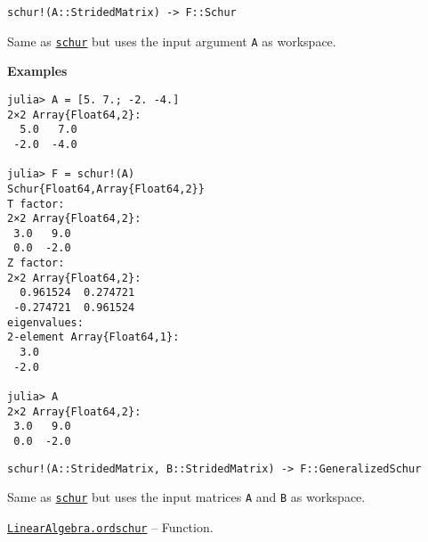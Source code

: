 \begin{adjustwidth}{2em}{0pt}


\begin{verbatim}
schur!(A::StridedMatrix) -> F::Schur
\end{verbatim}

Same as \hyperlink{17132870828407138368}{\texttt{schur}} but uses the input argument \texttt{A} as workspace.

\textbf{Examples}


\begin{verbatim}
julia> A = [5. 7.; -2. -4.]
2×2 Array{Float64,2}:
  5.0   7.0
 -2.0  -4.0

julia> F = schur!(A)
Schur{Float64,Array{Float64,2}}
T factor:
2×2 Array{Float64,2}:
 3.0   9.0
 0.0  -2.0
Z factor:
2×2 Array{Float64,2}:
  0.961524  0.274721
 -0.274721  0.961524
eigenvalues:
2-element Array{Float64,1}:
  3.0
 -2.0

julia> A
2×2 Array{Float64,2}:
 3.0   9.0
 0.0  -2.0
\end{verbatim}




\begin{lstlisting}
schur!(A::StridedMatrix, B::StridedMatrix) -> F::GeneralizedSchur
\end{lstlisting}

Same as \hyperlink{17132870828407138368}{\texttt{schur}} but uses the input matrices \texttt{A} and \texttt{B} as workspace.



\end{adjustwidth}
\hypertarget{4329711108255537481}{} 
\hyperlink{4329711108255537481}{\texttt{LinearAlgebra.ordschur}}  -- {Function.}

